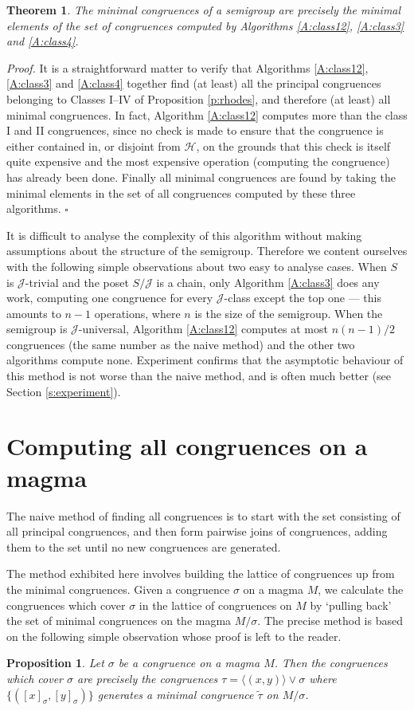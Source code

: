 \documentclass{acmconf}
\newtheorem{theorem}{Theorem}
\newtheorem{proposition}{Proposition}
\begin{document}
\begin{theorem}
The minimal congruences of a semigroup are precisely the
minimal elements of the set of congruences computed by 
Algorithms \ref{A:class12}, \ref{A:class3} and \ref{A:class4}.
\end{theorem}
\emph{Proof.}
It is a straightforward matter to verify that
Algorithms \ref{A:class12}, \ref{A:class3} and \ref{A:class4}
together find (at least) all the principal congruences belonging to 
Classes I--IV of  Proposition \ref{p:rhodes}, and therefore
(at least) all minimal congruences. 
In fact, Algorithm \ref{A:class12} computes more than the class
I and II congruences, since no check is made to ensure that the 
congruence is either contained in, or disjoint from $\mathscr{H}$,
on the grounds that this check is itself quite expensive and the most 
expensive operation (computing the congruence) has already been done.
Finally all minimal congruences
are found by taking the minimal elements in the set of 
all congruences computed by these three algorithms. 
$\square$

It is difficult to analyse the complexity of this 
algorithm without making assumptions about the
structure of the semigroup. Therefore we content ourselves with the
following simple observations about two easy to analyse cases. 
When $S$ is $\mathscr{J}$-trivial
and the poset $S/\mathscr{J}$ is a chain, only Algorithm \ref{A:class3} 
does any work, computing one congruence for every $\mathscr{J}$-class except
the top one --- this amounts to $n-1$ operations, where $n$ is the size
of the semigroup. 
When the semigroup is $\mathscr{J}$-universal, 
Algorithm \ref{A:class12} computes at most $n(n-1)/2$ congruences
(the same number as the naive method) and the other two algorithms 
compute none.
Experiment confirms that the asymptotic behaviour of this method is 
not worse than the naive method, and is often much better 
(see Section \ref{s:experiment}).


\section{Computing all congruences on a magma}
The naive method of finding all congruences is to start with
the set consisting of all principal congruences, and then 
form pairwise joins of congruences, adding them to the set
until no new congruences are generated.

The method exhibited here involves building the lattice of congruences
up from the minimal congruences. Given a congruence $\sigma$ on a magma
$M$, we calculate the congruences which cover $\sigma$ in the lattice
of congruences on $M$ by `pulling back' the set of minimal congruences
on the magma $M/\sigma$. The precise method is based on the following
simple observation whose proof is left to the reader.
\begin{proposition}\label{T:pullback}
Let $\sigma$ be a congruence on a magma $M$. Then the congruences
which cover $\sigma$ are precisely the congruences
$\tau = \langle (x,y) \rangle \vee \sigma$ where 
$\{([x]_\sigma, [y]_\sigma)\}$ generates a minimal congruence $\tilde{\tau}$ on 
$M/\sigma$.
\end{proposition} 
\end{document}

